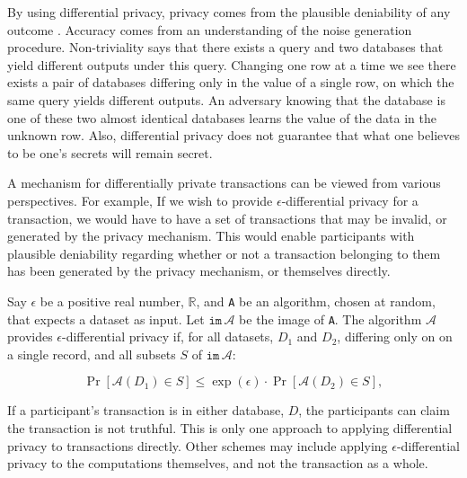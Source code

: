 \documentclass[10pt, titlepage, twocolumn]{report}
\begin{document}
\hspace*{15pt}
By using differential privacy, privacy comes from the plausible deniability of any outcome \cite{DP}. Accuracy comes from an understanding of the noise generation procedure. Non-triviality says that there exists a query and two databases that yield different outputs under this query. Changing one row at a time we see there exists a pair of databases differing only in the value of a single row, on which the same query yields different outputs. An adversary knowing that the database is one of these two almost identical databases learns the value of the data in the unknown row. Also, differential privacy does not guarantee that what one believes to be one's secrets will remain secret.

\hspace*{15pt}
A mechanism for differentially private transactions can be viewed from various perspectives. For example, If we wish to provide  \(\epsilon\)-differential privacy for a transaction, we would have to have a set of transactions that may be invalid, or generated by the privacy mechanism. This would enable participants with plausible deniability regarding whether or not a transaction belonging to them has been generated by the privacy mechanism, or themselves directly. 

\hspace*{15pt}
Say \(\epsilon\) be a positive real number, $\mathbb{R}$, and \texttt{A} be an algorithm, chosen at random, that expects a dataset as input. Let \(\texttt{im}\, {\mathcal {A}}\) be the image of \texttt{A}. The algorithm \(\mathcal {A}\) provides \(\epsilon\)-differential privacy if, for all datasets, \(D_{1}\) and \(D_{2}\), differing only on on a single record, and all subsets \(S\) of \(\texttt{im} \, {\mathcal {A}}\):

\begin{equation}
 \Pr[{\mathcal {A}}(D_{1})\in S]\leq \exp \left(\epsilon \right)\cdot \Pr[{\mathcal {A}}(D_{2})\in S],
\end{equation}

\hspace*{15pt}
If a participant's transaction is in either database, \(D\), the participants can claim the transaction is not truthful. This is only one approach to applying differential privacy to transactions directly. Other schemes may include applying \(\epsilon\)-differential privacy to the computations themselves, and not the transaction as a whole.
\end{document}
